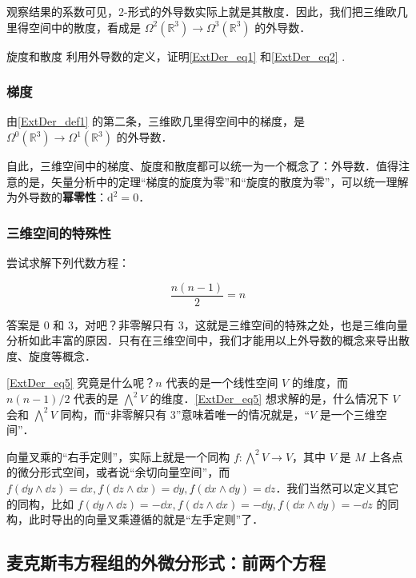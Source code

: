 观察结果的系数可见，2-形式的外导数实际上就是其散度．因此，我们把三维欧几里得空间中的散度，看成是 $\Omega^2(\mathbb{R}^3)\rightarrow\Omega^3(\mathbb{R}^3)$ 的外导数．

\begin{exercise}{旋度和散度}
利用外导数的定义，证明\autoref{ExtDer_eq1} 和\autoref{ExtDer_eq2} .
\end{exercise}

\subsubsection{梯度}

由\autoref{ExtDer_def1} 的第二条，三维欧几里得空间中的梯度，是 $\Omega^0(\mathbb{R}^3)\rightarrow\Omega^1(\mathbb{R}^3)$ 的外导数．

自此，三维空间中的梯度、旋度和散度都可以统一为一个概念了：外导数．值得注意的是，矢量分析中的定理“梯度的旋度为零”和“旋度的散度为零”，可以统一理解为外导数的\textbf{幂零性}：$\mathrm{d}^2=0$．

\subsubsection{三维空间的特殊性}

尝试求解下列代数方程：

\begin{equation}\label{ExtDer_eq5}
\frac{n(n-1)}{2}=n
\end{equation}

答案是 $0$ 和 $3$，对吧？非零解只有 $3$，这就是三维空间的特殊之处，也是三维向量分析如此丰富的原因．只有在三维空间中，我们才能用以上外导数的概念来导出散度、旋度等概念．

\autoref{ExtDer_eq5} 究竟是什么呢？$n$ 代表的是一个线性空间 $V$ 的维度，而 $n(n-1)/2$ 代表的是 $\bigwedge^2 V$ 的维度．\autoref{ExtDer_eq5} 想求解的是，什么情况下 $V$ 会和 $\bigwedge^2 V$ 同构，而“非零解只有 $3$”意味着唯一的情况就是，“$V$ 是一个三维空间”．

向量叉乘的“右手定则”，实际上就是一个同构 $f:\bigwedge^2 V\to V$，其中 $V$ 是 $M$ 上各点的微分形式空间，或者说“余切向量空间”，而 $f(\dd y\wedge \dd z)=\dd x, f(\dd z\wedge \dd x)=\dd y, f(\dd x\wedge \dd y)=\dd z$．我们当然可以定义其它的同构，比如 $f(\dd y\wedge \dd z)=-\dd x, f(\dd z\wedge \dd x)=-\dd y, f(\dd x\wedge \dd y)=-\dd z$ 的同构，此时导出的向量叉乘遵循的就是“左手定则”了．



\subsection{麦克斯韦方程组的外微分形式：前两个方程}


